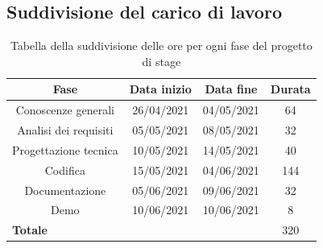 	\subsection{Suddivisione del carico di lavoro}
		\begin{center}
			\begin{table}[h!]
				\centering
				\begin{tabular}{c | c | c | c} 
					\textbf{Fase} & \textbf{Data inizio} & \textbf{Data fine} & \textbf{Durata}\\
					\hline
					Conoscenze generali   & 26/04/2021 & 04/05/2021 & 64 \\
					Analisi dei requisiti       & 05/05/2021 & 08/05/2021 & 32 \\
					Progettazione tecnica & 10/05/2021 & 14/05/2021 & 40 \\
					Codifica                       & 15/05/2021 & 04/06/2021 & 144 \\
					Documentazione         & 05/06/2021 & 09/06/2021 & 32 \\
					Demo                           & 10/06/2021 & 10/06/2021 & 8 \\
					\hline\hline
					\multicolumn{3}{l}{\textbf{Totale}} & 320 \\
				\end{tabular}
				\vspace{0.3cm}
				\caption{Tabella della suddivisione delle ore per ogni fase del progetto di stage}
			\end{table}
		\end{center}
\fi
		